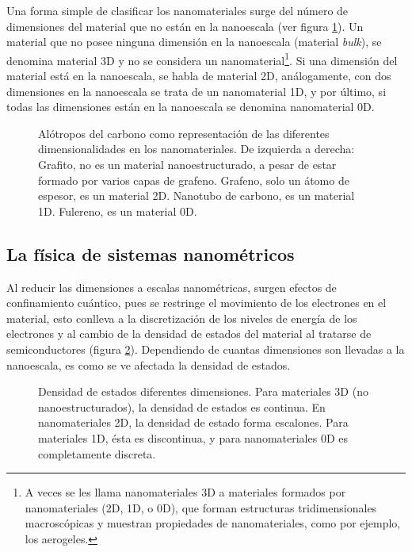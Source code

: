 Una forma simple de clasificar los nanomateriales surge del número de dimensiones del material que no están en la nanoescala (ver figura \ref{fig:carbon_allotropes}). Un material que no posee ninguna dimensión en la nanoescala (material \emph{bulk}), se denomina material 3D y no  se considera un nanomaterial\footnote{A veces se les llama nanomateriales 3D a materiales formados por nanomateriales (2D, 1D, o 0D), que forman estructuras tridimensionales macroscópicas y muestran propiedades de nanomateriales, como por ejemplo, los aerogeles.}. Si una dimensión del material está en la nanoescala, se habla de material 2D, análogamente, con dos dimensiones en la nanoescala se trata de un nanomaterial 1D, y por último, si todas las dimensiones están en la nanoescala se denomina nanomaterial 0D.
\begin{figure}
	\centering
	\caption[Alótropos del carbono mostrando las diferentes dimensionalidades de los nanomateriales]{Alótropos del carbono como representación de las diferentes dimensionalidades en los nanomateriales. De izquierda a derecha: Grafito, no es un material nanoestructurado, a pesar de estar formado por varios capas de grafeno. Grafeno, solo un átomo de espesor, es un material 2D. Nanotubo de carbono, es un material 1D. Fulereno, es un material 0D.}
	\label{fig:carbon_allotropes}
\end{figure}

\subsection{La física de sistemas nanométricos}
Al reducir las dimensiones a escalas nanométricas, surgen efectos de confinamiento cuántico, pues se restringe el movimiento de los electrones en el material, esto conlleva a la discretización de los niveles de energía de los electrones y al cambio de la densidad de estados del material al tratarse de semiconductores (figura \ref{fig:DoE}). Dependiendo de cuantas dimensiones son llevadas a la nanoescala, es como se ve afectada la densidad de estados.

\begin{figure}[h!]
	\centering
	\caption[Densidad de estados en diferentes dimensionalidades]{Densidad de estados diferentes dimensiones. Para materiales 3D (no nanoestructurados), la densidad de estados es continua. En nanomateriales 2D, la densidad de estado forma escalones. Para materiales 1D, ésta es discontinua, y para nanomateriales 0D es completamente discreta. }
	\label{fig:DoE}
\end{figure}

